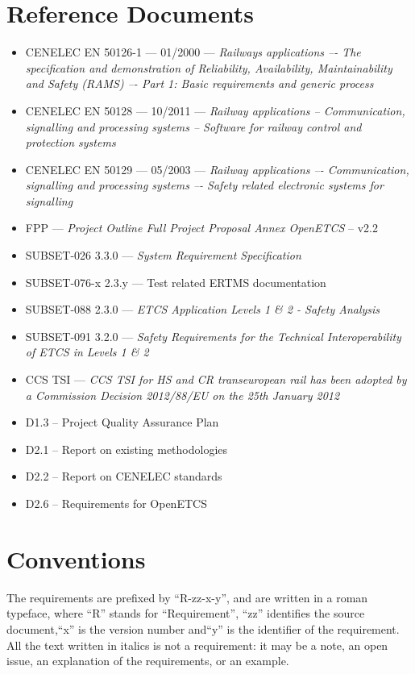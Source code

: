 \section{Reference Documents}
\begin{itemize}
\item CENELEC EN 50126-1 --- 01/2000 --- \emph{Railways applications –- The specification and
demonstration of Reliability, Availability, Maintainability and Safety (RAMS) –- Part 1:
Basic requirements and generic process}
\item CENELEC EN 50128 --- 10/2011 --- \emph{Railway applications -- Communication, signalling and
processing systems -- Software for railway control and protection systems}
\item CENELEC EN 50129 --- 05/2003 --- \emph{Railway applications –- Communication, signalling and
processing systems –- Safety related electronic systems for signalling}
\item FPP --- \emph{Project Outline Full Project Proposal Annex OpenETCS} -- v2.2
\item SUBSET-026 3.3.0 --- \emph{System Requirement Specification}
\item SUBSET-076-x 2.3.y --- Test related ERTMS documentation
\item SUBSET-088 2.3.0 --- \emph{ETCS Application Levels 1 \& 2 - Safety Analysis}
\item SUBSET-091 3.2.0 --- \emph{Safety Requirements for the Technical Interoperability
of ETCS in Levels 1 \& 2}
\item CCS TSI --- \emph{ CCS TSI for HS and CR transeuropean rail has been adopted by a Commission Decision 2012/88/EU on the 25th January 2012}
\item D1.3 -- Project Quality Assurance Plan
\item D2.1 -- Report on existing methodologies 
\item D2.2 -- Report on CENELEC standards
\item D2.6 -- Requirements for OpenETCS
\end{itemize}


\section{Conventions}
The requirements are prefixed by “R-zz-x-y”, and are written in a roman typeface, where ``R''
stands for ``Requirement'', ``zz'' identifies the source document,``x''
is the version number and``y'' is the identifier of the requirement. All the text
written in italics is not a requirement: it may be a note, an open issue, an
explanation of the requirements, or an example.

